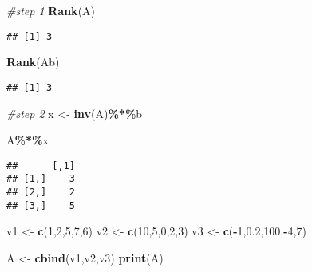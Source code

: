 \documentclass[
]{article}
\newenvironment{Shaded}{\begin{snugshade}}{\end{snugshade}}
\newcommand{\CommentTok}[1]{\textcolor[rgb]{0.56,0.35,0.01}{\textit{#1}}}
\newcommand{\DecValTok}[1]{\textcolor[rgb]{0.00,0.00,0.81}{#1}}
\newcommand{\FloatTok}[1]{\textcolor[rgb]{0.00,0.00,0.81}{#1}}
\newcommand{\FunctionTok}[1]{\textcolor[rgb]{0.13,0.29,0.53}{\textbf{#1}}}
\newcommand{\NormalTok}[1]{#1}
\newcommand{\OtherTok}[1]{\textcolor[rgb]{0.56,0.35,0.01}{#1}}
\newcommand{\SpecialCharTok}[1]{\textcolor[rgb]{0.81,0.36,0.00}{\textbf{#1}}}
\begin{document}
\begin{Shaded}
\begin{Highlighting}[]
\CommentTok{\#step 1}
\FunctionTok{Rank}\NormalTok{(A)}
\end{Highlighting}
\end{Shaded}

\begin{verbatim}
## [1] 3
\end{verbatim}

\begin{Shaded}
\begin{Highlighting}[]
\FunctionTok{Rank}\NormalTok{(Ab)}
\end{Highlighting}
\end{Shaded}

\begin{verbatim}
## [1] 3
\end{verbatim}

\begin{Shaded}
\begin{Highlighting}[]
\CommentTok{\#step 2}
\NormalTok{x }\OtherTok{\textless{}{-}} \FunctionTok{inv}\NormalTok{(A)}\SpecialCharTok{\%*\%}\NormalTok{b}

\NormalTok{A}\SpecialCharTok{\%*\%}\NormalTok{x}
\end{Highlighting}
\end{Shaded}

\begin{verbatim}
##      [,1]
## [1,]    3
## [2,]    2
## [3,]    5
\end{verbatim}

\begin{Shaded}
\begin{Highlighting}[]
\NormalTok{v1 }\OtherTok{\textless{}{-}} \FunctionTok{c}\NormalTok{(}\DecValTok{1}\NormalTok{,}\DecValTok{2}\NormalTok{,}\DecValTok{5}\NormalTok{,}\DecValTok{7}\NormalTok{,}\DecValTok{6}\NormalTok{)}
\NormalTok{v2 }\OtherTok{\textless{}{-}} \FunctionTok{c}\NormalTok{(}\DecValTok{10}\NormalTok{,}\DecValTok{5}\NormalTok{,}\DecValTok{0}\NormalTok{,}\DecValTok{2}\NormalTok{,}\DecValTok{3}\NormalTok{)}
\NormalTok{v3 }\OtherTok{\textless{}{-}} \FunctionTok{c}\NormalTok{(}\SpecialCharTok{{-}}\DecValTok{1}\NormalTok{,}\FloatTok{0.2}\NormalTok{,}\DecValTok{100}\NormalTok{,}\SpecialCharTok{{-}}\DecValTok{4}\NormalTok{,}\DecValTok{7}\NormalTok{)}

\NormalTok{A }\OtherTok{\textless{}{-}} \FunctionTok{cbind}\NormalTok{(v1,v2,v3)}
\FunctionTok{print}\NormalTok{(A)}
\end{Highlighting}
\end{Shaded}
\end{document}
